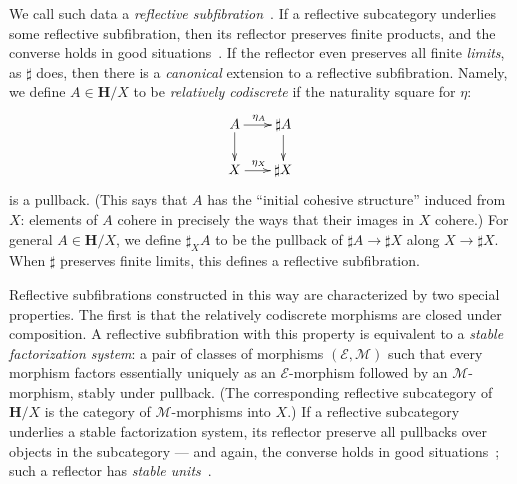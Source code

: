 \documentclass[copyright]{eptcs}
\renewcommand{\H}{\ensuremath{\mathbf{H}}\xspace}
\newcommand{\sharpsub}[1]{\sharp_{\scriptscriptstyle #1}}
\newcommand{\E}{\ensuremath{\mathcal{E}}\xspace}
\newcommand{\M}{\ensuremath{\mathcal{M}}\xspace}
\begin{document}
We call such data a \emph{reflective subfibration}~\cite{CJKP}.
If a reflective subcategory underlies some reflective subfibration, then its reflector preserves finite products, and the converse holds in good situations~\cite{ShulmanSubfibrations}.
If the reflector even preserves all finite \emph{limits}, as $\sharp$ does, then there is a \emph{canonical} extension to a reflective subfibration.
Namely, we define $A\in\H/X$ to be \emph{relatively codiscrete} if the naturality square for $\eta$:
\[\vcenter{\xymatrix@-.5pc{
    A\ar[r]^{\eta_A}\ar[d] &
    \sharp A\ar[d]\\
    X\ar[r]^{\eta_X} &
    \sharp X
  }}\]
is a pullback.
(This says that $A$ has the ``initial cohesive structure'' induced from $X$: elements of $A$ cohere in precisely the ways that their images in $X$ cohere.)
For general $A\in\H/X$, we define $\sharpsub{X}A$ to be the pullback of $\sharp A \to \sharp X$ along $X\to \sharp X$.
When $\sharp$ preserves finite limits, this defines a reflective subfibration.

Reflective subfibrations constructed in this way are characterized by two special properties.
The first is that the relatively codiscrete morphisms are closed under composition.
A reflective subfibration with this property is equivalent to a \emph{stable factorization system}: a pair of classes of morphisms $(\E,\M)$ such that every morphism factors essentially uniquely as an \E-morphism followed by an \M-morphism, stably under pullback.
(The corresponding reflective subcategory of $\H/X$
is the category of \M-morphisms into $X$.)
If a reflective subcategory underlies a stable factorization system, its reflector preserve all pullbacks over objects in the subcategory --- and again, the converse holds in good situations~\cite{ShulmanSubfibrations}; such a reflector has \emph{stable units}~\cite{CHK}.
\end{document}
